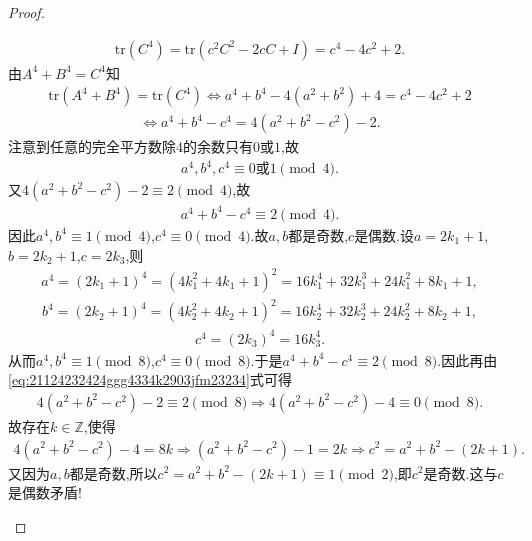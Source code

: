 \documentclass[../../main.tex]{subfiles}
\begin{document}
\begin{proof}
\begin{enumerate}[(1)]
\begin{align*}
\mathrm{tr}(C^4) = \mathrm{tr}(c^2C^2 - 2cC + I) = c^4 - 4c^2 + 2.
\end{align*}
由$A^4 + B^4 = C^4$知
\begin{align*}
\mathrm{tr}(A^4 + B^4) = \mathrm{tr}(C^4) \Longleftrightarrow a^4 + b^4 - 4(a^2 + b^2) + 4 = c^4 - 4c^2 + 2
\end{align*}
\begin{align}
\Longleftrightarrow a^4 + b^4 - c^4 = 4(a^2 + b^2 - c^2) - 2. \label{eq:21124232424ggg4334k2903jfm23234}
\end{align}
注意到任意的完全平方数除$4$的余数只有$0$或$1$,故
\begin{align*}
a^4, b^4, c^4 \equiv 0 \text{或} 1 \pmod{4}.
\end{align*}
又$4(a^2 + b^2 - c^2) - 2 \equiv 2 \pmod{4}$,故
\begin{align*}
a^4 + b^4 - c^4 \equiv 2 \pmod{4}.
\end{align*}
因此$a^4, b^4 \equiv 1 \pmod{4}$,$c^4 \equiv 0 \pmod{4}$.故$a,b$都是奇数,$c$是偶数.设$a = 2k_1 + 1$,$b = 2k_2 + 1$,$c = 2k_3$,则
\begin{align*}
a^4 = (2k_1 + 1)^4 = (4k_1^2 + 4k_1 + 1)^2 = 16k_1^4 + 32k_1^3 + 24k_1^2 + 8k_1 + 1,
\end{align*}
\begin{align*}
b^4 = (2k_2 + 1)^4 = (4k_2^2 + 4k_2 + 1)^2 = 16k_2^4 + 32k_2^3 + 24k_2^2 + 8k_2 + 1,
\end{align*}
\begin{align*}
c^4 = (2k_3)^4 = 16k_3^4.
\end{align*}
从而$a^4, b^4 \equiv 1 \pmod{8}$,$c^4 \equiv 0 \pmod{8}$.于是$a^4 + b^4 - c^4 \equiv 2 \pmod{8}$.因此再由\eqref{eq:21124232424ggg4334k2903jfm23234}式可得
\begin{align*}
4(a^2 + b^2 - c^2) - 2 \equiv 2 \pmod{8} \Longrightarrow 4(a^2 + b^2 - c^2) - 4 \equiv 0 \pmod{8}.
\end{align*}
故存在$k\in \mathbb{Z}$,使得
\begin{align*}
4(a^2 + b^2 - c^2) - 4 = 8k \Longrightarrow (a^2 + b^2 - c^2) - 1 = 2k \Longrightarrow c^2 = a^2 + b^2 - (2k + 1).
\end{align*}
又因为$a,b$都是奇数,所以$c^2 = a^2 + b^2 - (2k + 1) \equiv 1 \pmod{2}$,即$c^2$是奇数.这与$c$是偶数矛盾!


\end{enumerate}
\end{proof}
\end{document}
